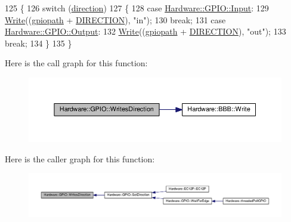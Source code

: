 \begin{DoxyCode}
125     \{
126         \textcolor{keywordflow}{switch} (\hyperlink{class_hardware_1_1_g_p_i_o_a77e93e4f6650507fdc4898d272d540e7}{direction})
127         \{
128         \textcolor{keywordflow}{case} \hyperlink{class_hardware_1_1_g_p_i_o_a7507431d6341c146f22dcdb21b78ffd4a5614339496b61db558bd9a26a327088e}{Hardware::GPIO::Input}:
129             \hyperlink{class_hardware_1_1_b_b_b_a155cc06f76d82a6b690ce5ea08e7c68e}{Write}((\hyperlink{class_hardware_1_1_g_p_i_o_ac47062ed6aba52b9e8506e1575bf5061}{gpiopath} + \hyperlink{_g_p_i_o_8h_a1d692daf1ffadae2243a5ab556589629}{DIRECTION}), \textcolor{stringliteral}{"in"});
130             \textcolor{keywordflow}{break};
131         \textcolor{keywordflow}{case} \hyperlink{class_hardware_1_1_g_p_i_o_a7507431d6341c146f22dcdb21b78ffd4a72432a9b39a6e45297b1158da8bb60eb}{Hardware::GPIO::Output}:
132             \hyperlink{class_hardware_1_1_b_b_b_a155cc06f76d82a6b690ce5ea08e7c68e}{Write}((\hyperlink{class_hardware_1_1_g_p_i_o_ac47062ed6aba52b9e8506e1575bf5061}{gpiopath} + \hyperlink{_g_p_i_o_8h_a1d692daf1ffadae2243a5ab556589629}{DIRECTION}), \textcolor{stringliteral}{"out"});
133             \textcolor{keywordflow}{break};
134         \}
135     \}
\end{DoxyCode}


Here is the call graph for this function\+:\nopagebreak
\begin{figure}[H]
\begin{center}
\leavevmode
\includegraphics[width=350pt]{class_hardware_1_1_g_p_i_o_a73426139a22b7e489a9c402678a477e4_cgraph}
\end{center}
\end{figure}




Here is the caller graph for this function\+:\nopagebreak
\begin{figure}[H]
\begin{center}
\leavevmode
\includegraphics[width=350pt]{class_hardware_1_1_g_p_i_o_a73426139a22b7e489a9c402678a477e4_icgraph}
\end{center}
\end{figure}


